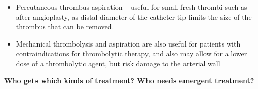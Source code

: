 \documentclass[
]{book}
\begin{document}
\begin{itemize}
\begin{itemize}
    \begin{itemize}
    \item
      Absolute contraindications include active bleeding disorder,
      CVA (\textless6mo), CNS injury or head injury (\textless3mo), or GI bleed
      (\textless10d).
    \item
      Relative contraindications include recent major surgery,
      uncontrolled hypertension, intracranial tumor, pregnancy,
      recent eye surgery, hepatic failure, CPR (\textless10d), or
      bacterial endocarditis.
    \item
      1-2\% risk of hemorrhagic stroke. If neurologic deficit
      develops during thrombolysis, stop lysis and perform
      immediate head CT.
      \citep{ourielComparisonRecombinantUrokinase1998}
    \end{itemize}
  \item
    Percutaneous thrombus aspiration -- useful for small fresh
    thrombi such as after angioplasty, as distal diameter of the
    catheter tip limits the size of the thrombus that can be
    removed.~
  \item
    Mechanical thrombolysis and aspiration are also useful for
    patients with contraindications for thrombolytic therapy, and
    also may allow for a lower dose of a thrombolytic agent, but
    risk damage to the arterial wall
  \end{itemize}
\end{itemize}

\textbf{Who gets which kinds of treatment? Who needs emergent treatment?}
\end{document}
